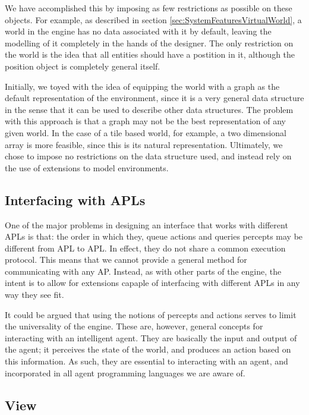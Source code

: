 We have accomplished this by imposing as few restrictions as possible
on these objects. For example, as described in section \ref{sec:SystemFeaturesVirtualWorld},
a world in the engine has no data associated with it by default, leaving
the modelling of it completely in the hands of the designer. The only
restriction on the world is the idea that all entities should have
a postition in it, although the position object is completely general
itself.

Initially, we toyed with the idea of equipping the world with a graph
as the default representation of the environment, since it is a very
general data structure in the sense that it can be used to describe
other data structures. The problem with this approach is that a graph
may not be the best representation of any given world. In the case
of a tile based world, for example, a two dimensional array is more
feasible, since this is its natural representation. Ultimately, we
chose to impose no restrictions on the data structure used, and instead
rely on the use of extensions to model environments.


\subsection*{Interfacing with APLs}

One of the major problems in designing an interface that works with
different APLs is that: the order in which they, queue actions and
queries percepts may be different from APL to APL. In effect, they
do not share a common execution protocol. This means that we cannot
provide a general method for communicating with any AP. Instead, as
with other parts of the engine, the intent is to allow for extensions
capaple of interfacing with different APLs in any way they see fit.

It could be argued that using the notions of percepts and actions
serves to limit the universality of the engine. These are, however,
general concepts for interacting with an intelligent agent. They are
basically the input and output of the agent; it perceives the state
of the world, and produces an action based on this information. As
such, they are essential to interacting with an agent, and incorporated
in all agent programming languages we are aware of.


\subsection*{View}

